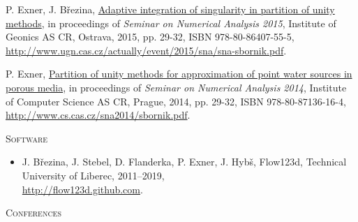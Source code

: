 \documentclass[bibliography=totocnumbered,dvipsnames,FM,Dis]{tulthesis_autoreferat}
\begin{document}
\begin{itemize}[label={}, leftmargin=*]
{\item
P. Exner, J. B{\v r}ezina, \href{http://www.ugn.cas.cz/actually/event/2015/sna/sna-sbornik.pdf}{Adaptive integration of singularity in partition of unity methods},
in proceedings of \emph{Seminar on Numerical Analysis 2015}, Institute of Geonics AS CR, Ostrava, 2015, pp. 29-32, ISBN 978-80-86407-55-5, \\
\href{http://www.ugn.cas.cz/actually/event/2015/sna/sna-sbornik.pdf}{http://www.ugn.cas.cz/actually/event/2015/sna/sna-sbornik.pdf}.

\item
P. Exner, \href{http://www.cs.cas.cz/sna2014/sbornik.pdf}{Partition of unity methods for approximation of point water sources in porous media},
in proceedings of \emph{Seminar on Numerical Analysis 2014}, Institute of Computer Science AS CR, Prague, 2014, pp. 29-32, ISBN 978-80-87136-16-4, \\
\href{http://www.cs.cas.cz/sna2014/sbornik.pdf}{http://www.cs.cas.cz/sna2014/sbornik.pdf}.
}
\end{itemize}
%
\vspace{0.5cm}
%
{\large\textsc{Software}}
\begin{itemize}[label={}, leftmargin=*]
\item
J. B{\v r}ezina, J. Stebel, D. Flanderka, P. Exner, J. Hyb{\v s}, Flow123d, 
Technical University of Liberec, 2011--2019, \\
\href{http://flow123d.github.com}{http://flow123d.github.com}.
\end{itemize}
%
\vspace{0.5cm}
%
{\large\textsc{Conferences}}
%
\end{document}
